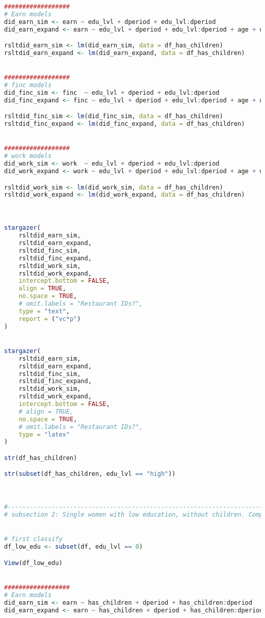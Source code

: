 \documentclass[a4paper]{article}
\begin{document}
\begin{lstlisting}[language=R]
##################
# Earn models
did_earn_sim <- earn ~ edu_lvl + dperiod + edu_lvl:dperiod
did_earn_expand <- earn ~ edu_lvl + dperiod + edu_lvl:dperiod + age + urate + nonwhite

rsltdid_earn_sim <- lm(did_earn_sim, data = df_has_children)
rsltdid_earn_expand <- lm(did_earn_expand, data = df_has_children)


##################
# finc models
did_finc_sim <- finc  ~ edu_lvl + dperiod + edu_lvl:dperiod
did_finc_expand <- finc ~ edu_lvl + dperiod + edu_lvl:dperiod + age + urate + nonwhite

rsltdid_finc_sim <- lm(did_finc_sim, data = df_has_children)
rsltdid_finc_expand <- lm(did_finc_expand, data = df_has_children)


##################
# work models
did_work_sim <- work  ~ edu_lvl + dperiod + edu_lvl:dperiod
did_work_expand <- work ~ edu_lvl + dperiod + edu_lvl:dperiod + age + urate + nonwhite

rsltdid_work_sim <- lm(did_work_sim, data = df_has_children)
rsltdid_work_expand <- lm(did_work_expand, data = df_has_children)



stargazer(
    rsltdid_earn_sim,
    rsltdid_earn_expand,
    rsltdid_finc_sim,
    rsltdid_finc_expand,
    rsltdid_work_sim,
    rsltdid_work_expand,
    intercept.bottom = FALSE,
    align = TRUE,
    no.space = TRUE,
    # omit.labels = "Restaurant IDs?",
    type = "text",
    report = ("vc*p")
)


stargazer(
    rsltdid_earn_sim,
    rsltdid_earn_expand,
    rsltdid_finc_sim,
    rsltdid_finc_expand,
    rsltdid_work_sim,
    rsltdid_work_expand,
    intercept.bottom = FALSE,
    # align = TRUE,
    no.space = TRUE,
    # omit.labels = "Restaurant IDs?",
    type = "latex"
)

str(df_has_children)

str(subset(df_has_children, edu_lvl == "high"))



#---------------------------------------------------------------------------------------
# subsection 2: Single women with low education, without children. Compare them


# first classify
df_low_edu <- subset(df, edu_lvl == 0)

View(df_low_edu)


##################
# Earn models
did_earn_sim <- earn ~ has_children + dperiod + has_children:dperiod
did_earn_expand <- earn ~ has_children + dperiod + has_children:dperiod + age + urate + nonwhite


\end{lstlisting}
\end{document}
